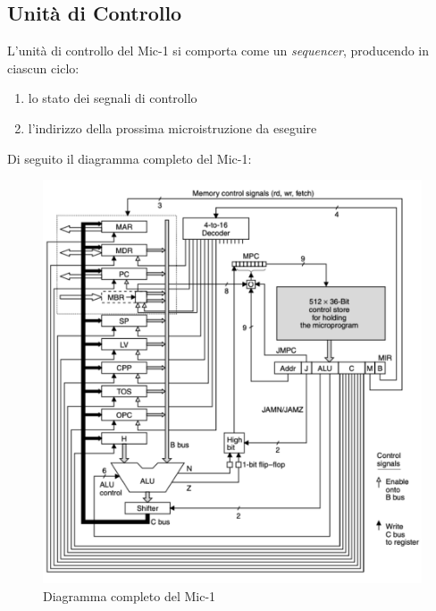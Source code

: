 \subsection{Unità di Controllo}
L'unità di controllo del Mic-1 si comporta come un \textit{sequencer}, producendo in ciascun ciclo:
\begin{enumerate}
    \item lo stato dei segnali di controllo
    \item l'indirizzo della prossima microistruzione da eseguire
\end{enumerate}
Di seguito il diagramma completo del Mic-1:
\begin{figure}[H]
	\centering
	\includegraphics[width=1\textwidth]{img/Esercizio_9/diag_mic-1}
	\caption{Diagramma completo del Mic-1}
	\label{diag_mic-1} 
\end{figure}

